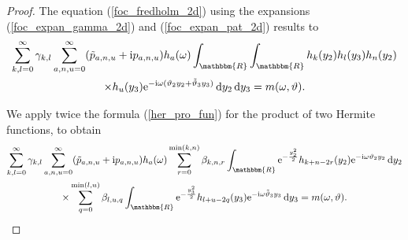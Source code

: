 \documentclass[a4paper,twoside,10pt]{article}
\theoremstyle{break}
\theoremstyle{nonumberplain}
\newtheorem{proof}{Proof}
\newcommand{\R}{\mathbbm{R}}
\newcommand{\e}{\mathrm e}
\renewcommand{\i}{\mathrm i}
\renewcommand{\d}{\,\mathrm d}
\begin{document}
\begin{proof}
The equation (\ref{foc_fredholm_2d}) using the expansions (\ref{foc_expan_gamma_2d}) and (\ref{foc_expan_pat_2d}) results to 
\begin{multline*}%
 \sum_{k,l=0}^\infty \gamma_{k,l} \sum_{a,n,u=0}^\infty (\tilde p_{a,n,u} +\i p_{a,n,u} ) h_a (\omega)
 \int_\R \int_\R  h_k (y_2 ) h_l (y_3) h_n (y_2 ) \\
\times h_u (y_3)  \e^{- \i \omega (\vartheta_2 y_2 + \tilde\vartheta_3 y_3 )}  \d y_2  \d y_3 =  m ( \omega, \vartheta) .
\end{multline*}

We apply twice the formula (\ref{her_pro_fun}) for the product of two Hermite functions, to obtain
\begin{multline*}%
\sum_{k,l=0}^\infty \gamma_{k,l} \sum_{a,n,u=0}^\infty (\tilde p_{a,n,u} +\i p_{a,n,u} ) h_a (\omega) \sum_{r=0}^{\min (k,n)} \beta_{k,n,r}
\int_\R \e^{-\frac{y_2^2}2} h_{k+n-2r} (y_2) \e^{- \i \omega \vartheta_2 y_2} \d y_2
\\
\times \sum_{q=0}^{\min (l,u)} \beta_{l,u,q}
\int_\R \e^{-\frac{y_3^2}2} h_{l+u-2q} (y_3) \e^{- \i \omega \tilde\vartheta_3 y_3} \d y_3  =  m ( \omega, \vartheta) .
\end{multline*}


\end{proof}
\end{document}

